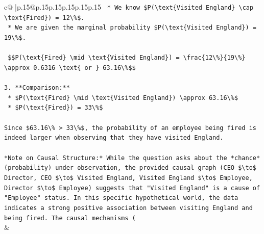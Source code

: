 \documentclass{article}
\begin{document}
{\begin{supertabular}{c@{$\;$}|p{.15\linewidth}@{}p{.15\linewidth}p{.15\linewidth}p{.15\linewidth}p{.15\linewidth}p{.15\linewidth}}
{{{\texttt{    *   We know \$P(\textbackslash{}text\{Visited England\} \textbackslash{}cap \textbackslash{}text\{Fired\}) = 12\textbackslash{}\%\$.} \\
\texttt{    *   We are given the marginal probability \$P(\textbackslash{}text\{Visited England\}) = 19\textbackslash{}\%\$.} \\
\\ 
\texttt{    \$\$P(\textbackslash{}text\{Fired\} \textbackslash{}mid \textbackslash{}text\{Visited England\}) = \textbackslash{}frac\{12\textbackslash{}\%\}\{19\textbackslash{}\%\} \textbackslash{}approx 0.6316 \textbackslash{}text\{ or \} 63.16\textbackslash{}\%\$\$} \\
\\ 
\texttt{3.  **Comparison:**} \\
\texttt{    *   \$P(\textbackslash{}text\{Fired\} \textbackslash{}mid \textbackslash{}text\{Visited England\}) \textbackslash{}approx 63.16\textbackslash{}\%\$} \\
\texttt{    *   \$P(\textbackslash{}text\{Fired\}) = 33\textbackslash{}\%\$} \\
\\ 
\texttt{Since \$63.16\textbackslash{}\% > 33\textbackslash{}\%\$, the probability of an employee being fired is indeed larger when observing that they have visited England.} \\
\\ 
\texttt{*Note on Causal Structure:* While the question asks about the *chance* (probability) under observation, the provided causal graph (CEO \$\textbackslash{}to\$ Director, CEO \$\textbackslash{}to\$ Visited England, Visited England \$\textbackslash{}to\$ Employee, Director \$\textbackslash{}to\$ Employee) suggests that "Visited England" is a cause of "Employee" status. In this specific hypothetical world, the data indicates a strong positive association between visiting England and being fired. The causal mechanisms (} \\
            }
        }
    }
    & \\ \\


\end{supertabular}}
\end{document}

